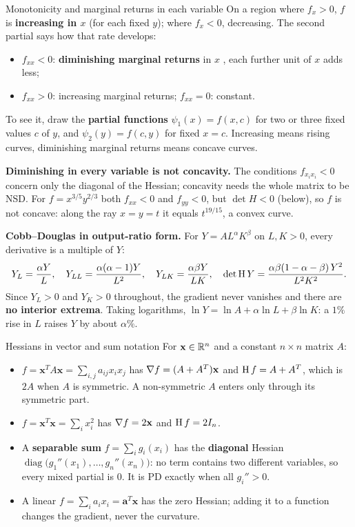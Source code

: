 \begin{rulebox}{Monotonicity and marginal returns in each variable}
On a region where $f_{x}>0$, $f$ is \textbf{increasing in $x$} (for each
fixed $y$); where $f_{x}<0$, decreasing. The second partial says how that
rate develops:
\begin{itemize}[leftmargin=1.6em,itemsep=0.3ex]
  \item $f_{xx}<0$: \textbf{diminishing marginal returns} in $x$
        , each further unit of $x$ adds
        less;
  \item $f_{xx}>0$: increasing marginal returns; $f_{xx}=0$: constant.
\end{itemize}
To see it, draw the \textbf{partial functions} $\psi_{1}(x)=f(x,c)$ for two
or three fixed values $c$ of $y$, and $\psi_{2}(y)=f(c,y)$ for fixed $x=c$.
Increasing means rising curves, diminishing marginal returns means concave
curves.

\textbf{Diminishing in every variable is not concavity.} The conditions
$f_{x_{i}x_{i}}<0$ concern only the diagonal of the Hessian; concavity needs
the whole matrix to be NSD. For $f=x^{3/5}y^{2/3}$ both $f_{xx}<0$ and
$f_{yy}<0$, but $\det H<0$ (below), so $f$ is not concave: along the ray
$x=y=t$ it equals $t^{19/15}$, a convex curve.

\textbf{Cobb--Douglas in output-ratio form.} For $Y=AL^{\alpha}K^{\beta}$
on $L,K>0$, every derivative is a multiple of $Y$:
\[
  Y_{L}=\frac{\alpha Y}{L},\quad
  Y_{LL}=\frac{\alpha(\alpha-1)Y}{L^{2}},\quad
  Y_{LK}=\frac{\alpha\beta Y}{LK},\quad
  \det\operatorname{H} Y=\frac{\alpha\beta(1-\alpha-\beta)\,Y^{2}}{L^{2}K^{2}} .
\]
Since $Y_{L}>0$ and $Y_{K}>0$ throughout, the gradient never vanishes and
there are \textbf{no interior extrema}. Taking logarithms,
$\ln Y=\ln A+\alpha\ln L+\beta\ln K$: a $1\%$ rise in $L$ raises $Y$ by
about $\alpha\%$.
\end{rulebox}

\begin{rulebox}{Hessians in vector and sum notation}
For $\mathbf{x}\in\mathbb{R}^{n}$ and a constant $n\times n$ matrix $A$:
\begin{itemize}[leftmargin=1.6em,itemsep=0.3ex]
  \item $f=\mathbf{x}^{T}A\mathbf{x}=\sum_{i,j}a_{ij}x_{i}x_{j}$ has
        $\nabla f=(A+A^{T})\mathbf{x}$ and $\operatorname{H} f=A+A^{T}$, which is $2A$
        when $A$ is symmetric. A non-symmetric $A$ enters only through its
        symmetric part.
  \item $f=\mathbf{x}^{T}\mathbf{x}=\sum_{i}x_{i}^{2}$ has $\nabla f=2\mathbf{x}$
        and $\operatorname{H} f=2I_{n}$.
  \item A \textbf{separable sum} $f=\sum_{i}g_{i}(x_{i})$ has the
        \textbf{diagonal} Hessian $\operatorname{diag}\bigl(g_{1}''(x_{1}),
        \ldots,g_{n}''(x_{n})\bigr)$: no term contains two different
        variables, so every mixed partial is $0$. It is PD exactly when all
        $g_{i}''>0$.
  \item A linear $f=\sum_{i}a_{i}x_{i}=\mathbf{a}^{T}\mathbf{x}$ has the zero
        Hessian; adding it to a function changes the gradient, never the
        curvature.
\end{itemize}
\end{rulebox}

